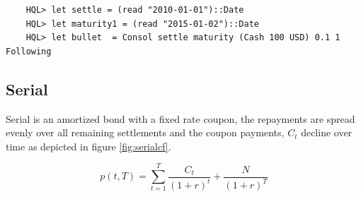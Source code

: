 \documentclass[11pt,a4paper]{article}
\numberwithin{equation}{section}
\begin{document}
	\begin{lstlisting}
	HQL> let settle = (read "2010-01-01")::Date
	HQL> let maturity1 = (read "2015-01-02")::Date
	HQL> let bullet  = Consol settle maturity (Cash 100 USD) 0.1 1 Following
	\end{lstlisting}

	\subsection{Serial}

	Serial is an amortized bond with a fixed rate coupon, the repayments are spread evenly over all remaining settlements and the coupon payments, $C_t$ decline over time as depicted in figure
	\ref{fig:serialcf}.

	\[ p(t,T) = \sum_{t=1}^{T}\frac{C_t}{(1+r)^t} + \frac{N}{(1+r)^T} \]
\end{document}
